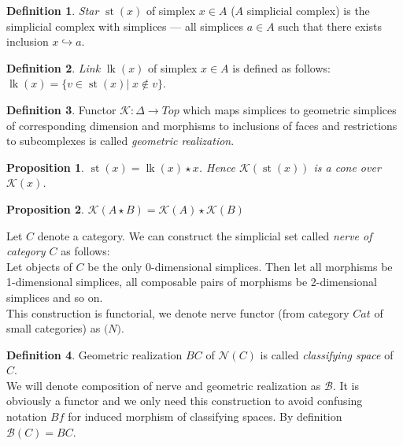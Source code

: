 \documentclass[a4paper, 12pt]{article}
\newtheorem{proposition}{Proposition}
\theoremstyle{definition}
\newtheorem{definition}{Definition}
\theoremstyle{remark}
\newcommand{\define}[1]{{\textit{#1}}}
\begin{document}
\begin{definition}
  \define{Star} $\operatorname{st}(x)$ of simplex $x \in A$ ($A$ simplicial complex) is the simplicial complex with simplices --- all simplices $a \in A$ such that there exists inclusion $x \hookrightarrow a$.
\end{definition}

\begin{definition}
  \define{Link} $\operatorname{lk}(x)$ of simplex $x \in A$ is defined as follows: $\operatorname{lk}(x) = \{v \in \operatorname{st}(x)|\; x \not\in v\}$.
\end{definition}

\begin{definition}
  Functor $\mathcal{K} : \Delta \to Top$ which maps simplices to geometric simplices of corresponding dimension and morphisms to inclusions of faces and restrictions to subcomplexes is called \define{geometric realization}.
\end{definition}

\begin{proposition}
  $\operatorname{st}(x) = \operatorname{lk}(x) \star x$. Hence $\mathcal{K}(\operatorname{st}(x))$ is a cone over $\mathcal{K}(x)$.
\end{proposition}

\begin{proposition}
  $\mathcal{K}(A \star B) = \mathcal{K}(A) \star \mathcal{K}(B)$
\end{proposition}

Let $C$ denote a category. We can construct the simplicial set called \define{nerve of category $C$} as follows:\\
Let objects of $C$ be the only 0-dimensional simplices. Then let all morphisms be 1-dimensional simplices, all composable pairs of morphisms be 2-dimensional simplices and so on.\\
This construction is functorial, we denote nerve functor (from category $Cat$ of small categories) as $\mathcal(N)$.

\begin{definition}
  Geometric realization $BC$ of $\mathcal{N}(C)$ is called \define{classifying space} of $C$.\\

  We will denote composition of nerve and geometric realization as $\mathcal{B}$. It is obviously a functor and we only need this construction to avoid confusing notation $Bf$ for induced morphism of classifying spaces. By definition $\mathcal{B}(C) = BC$.
\end{definition}
\end{document}
